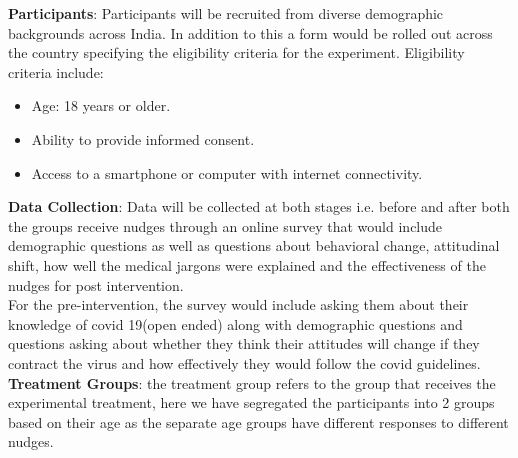 \documentclass[12pt, a4paper]{article}
\begin{document}
\textbf{Participants}: Participants will be recruited from diverse demographic backgrounds across India. In addition to this a form would be rolled out across the country specifying the eligibility criteria for the experiment. Eligibility criteria include:\\
\begin{itemize}
\item Age: 18 years or older.
\item Ability to provide informed consent.
\item Access to a smartphone or computer with internet connectivity.
\end{itemize}
\textbf{Data Collection}: Data will be collected at both stages i.e. before and after both the groups receive nudges through an online survey that would include demographic questions as well as questions about behavioral change, attitudinal shift, how well the medical jargons were explained and the effectiveness of the nudges for post intervention.\\
For the pre-intervention, the survey would include asking them about their knowledge of covid 19(open ended) along with demographic questions and questions asking about whether they think their attitudes will change if they contract the virus and how effectively they would follow the covid guidelines.\\


\textbf{Treatment Groups}: the treatment group refers to the group that receives the experimental treatment, here we have segregated the participants into 2 groups based on their age as the separate age groups have different responses to different nudges.\\
\end{document}
